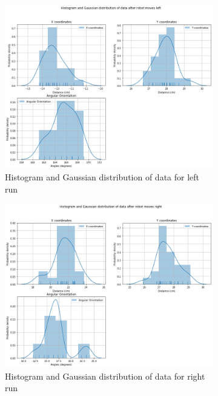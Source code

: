\documentclass[10pt,a4paper]{article}
\begin{document}
			 \begin{figure}[H]
			 	\begin{subfigure}{\textwidth}
			 		\centering
			 		\includegraphics[width=\linewidth]{img/histplot_lt.png}
			 		\caption{Histogram and Gaussian distribution of data for left run}
			 	\end{subfigure}
			 	\caption{}%
			\end{figure}
			\begin{figure}[H]
			 	\begin{subfigure}{\textwidth}
			 		\centering
			 		\includegraphics[width=\linewidth]{img/histplot_rt.png}
			 		\caption{Histogram and Gaussian distribution of data for right run}
			 	\end{subfigure}
			 	\caption{}%
			 \end{figure}	
			
\end{document}
